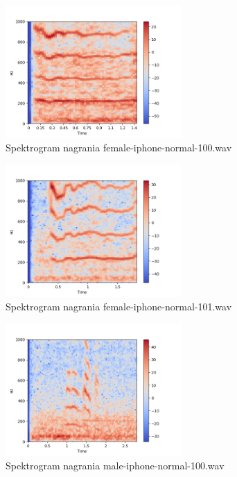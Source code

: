 \documentclass[a4paper,12pt]{extarticle}
\begin{document}
\begin{figure}[h]
\centering
\includegraphics[width=0.6\textwidth]{iphone-0}
\caption{Spektrogram nagrania female-iphone-normal-100.wav}
\end{figure}

\newpage

\begin{figure}[h]
\centering
\includegraphics[width=0.6\textwidth]{iphone-1}
\caption{Spektrogram nagrania female-iphone-normal-101.wav}
\end{figure}

\begin{figure}[h]
\centering
\includegraphics[width=0.6\textwidth]{iphone-2}
\caption{ Spektrogram nagrania male-iphone-normal-100.wav}
\end{figure}
\end{document}
